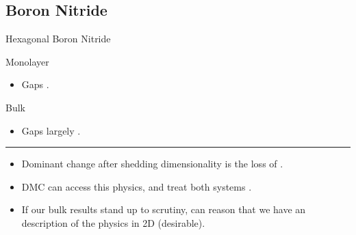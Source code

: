 \documentclass[12pt, pdf, hyperref={draft}, usenames, dvipsnames]{beamer}
\newcommand{\red}[1]{{\bf\color{LancsRed}{#1}}}
\newcommand{\blue}[1]{{\bf\color{NavyBlue}{#1}}}
\newcommand{\green}[1]{{\bf\color{ForestGreen}{#1}}}
\begin{document}
\subsection{Boron Nitride} %

\begin{frame}{Hexagonal Boron Nitride}

\begin{minipage}{0.5\textwidth}
\begin{block}{Monolayer}
\begin{itemize}
  \item Gaps \red{hard to determine}.
\end{itemize}
\end{block}
\end{minipage}%
\begin{minipage}{0.5\textwidth}
\begin{block}{Bulk}
\begin{itemize}
  \item Gaps largely \green{known}.
\end{itemize}
\end{block}
\end{minipage}
\vfill
\hrule
\vfill
\begin{itemize}
  \item Dominant change after shedding dimensionality is the loss of
  \blue{screening}.
  \item DMC can access this physics, and treat both systems \green{fairly}.
  \item If our bulk results stand up to scrutiny, can reason that we
  have an \green{equally good} description of the physics in 2D (desirable).

\end{itemize}
\end{frame}
\end{document}
